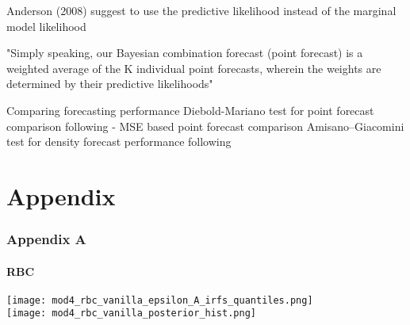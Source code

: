 \documentclass[11pt,a4paper,english]{article} %
\begin{document}
	Anderson (2008) suggest to use the predictive likelihood instead of the marginal model likelihood
	
	"Simply speaking, our Bayesian combination forecast (point forecast) is a weighted average of the K individual point forecasts, wherein the weights are determined by their predictive likelihoods" \cite{chin_bayesian_2019}
	
	Comparing forecasting performance
	Diebold-Mariano test for point forecast comparison following \cite{chin_bayesian_2019}
	- MSE based point forecast comparison 
	Amisano–Giacomini test for density forecast performance following  \cite{chin_bayesian_2019}

	
	
	\pagebreak
	
	
	
	\part{Appendix}
	
	\section{Appendix A}
	
	\subsection{RBC}
	
	\texttt{[image: mod4\_rbc\_vanilla\_epsilon\_A\_irfs\_quantiles.png]}\\
	
	\texttt{[image: mod4\_rbc\_vanilla\_posterior\_hist.png]}
\end{document}
